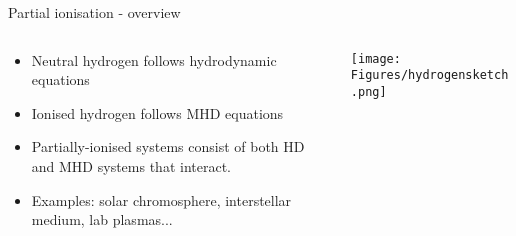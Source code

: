 \documentclass[10pt,aspectratio=169,usenames,dvipsnames]{beamer}
\begin{document}
\begin{frame}{Partial ionisation - overview}
\begin{columns}
\begin{column}{0.4\textwidth}
\begin{itemize}
    \item Neutral hydrogen follows hydrodynamic equations
    \item Ionised hydrogen follows MHD equations
    \item Partially-ionised systems consist of both HD and MHD systems that interact.
    \item Examples: solar chromosphere, interstellar medium, lab plasmas...
\end{itemize}
\end{column}
\begin{column}{0.6\textwidth}
\texttt{[image: Figures/hydrogensketch.png]} 
\end{column}
\end{columns}
\end{frame}
\end{document}
